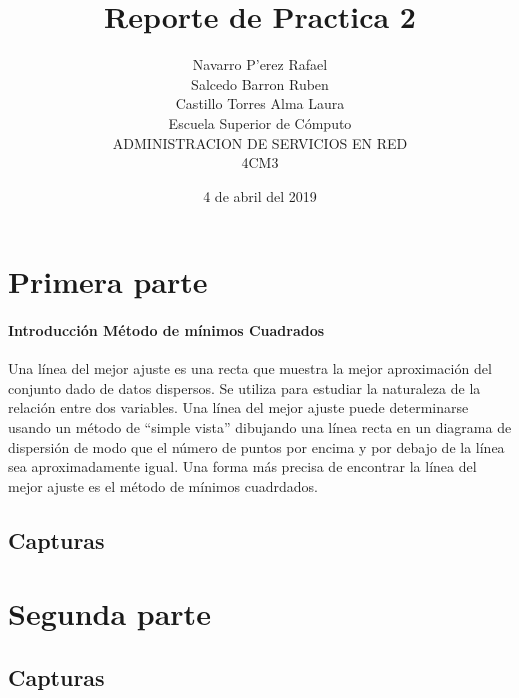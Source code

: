 \documentclass[12pt]{article}
\title{Reporte de  Practica 2}
\author{Navarro P'erez Rafael \\Salcedo Barron Ruben\\ Castillo Torres Alma Laura\\
		Escuela Superior de C\'omputo\\
		ADMINISTRACION DE SERVICIOS EN RED\\ 
		4CM3
		}
\date{4 de abril del 2019}
\begin{document}
\maketitle
\newpage 
\tableofcontents
\newpage 
\section{Primera parte}
\paragraph*{Introducción Método de mínimos Cuadrados}
Una línea del mejor ajuste es una recta que muestra la mejor aproximación del
conjunto dado de datos dispersos. Se utiliza para estudiar la naturaleza de la
relación entre dos variables.
Una línea del mejor ajuste puede determinarse usando un método de “simple vista”
dibujando una línea recta en un diagrama de dispersión de modo que el número de
puntos por encima y por debajo de la línea sea aproximadamente igual.
Una forma más precisa de encontrar la línea del mejor ajuste es el método de
mínimos cuadrdados.
\subsection{Capturas}
\section{Segunda parte}
\subsection{Capturas}
\end{document}
